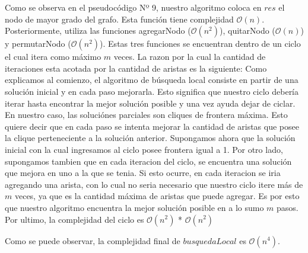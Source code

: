 \begin{itemize}
Como se observa en el pseudocódigo Nº 9, nuestro algoritmo coloca en $res$ el nodo de mayor grado del grafo. Esta función tiene complejidad $\mathcal{O}(n)$.
Posteriormente, utiliza las funciones agregarNodo ($\mathcal{O}(n^{2})$), quitarNodo ($\mathcal{O}(n)$) y permutarNodo ($\mathcal{O}(n^{2})$). Estas tres funciones se encuentran dentro de un ciclo el cual itera como máximo $m$ veces. La razon por la cual la cantidad de iteraciones esta acotada por la cantidad de aristas es la siguiente:\newline
Como explicamos al comienzo, el algoritmo de búsqueda local consiste en partir de una solución inicial y en cada paso mejorarla. Esto significa que nuestro ciclo debería iterar hasta encontrar la mejor solución posible y una vez ayuda dejar de ciclar. En nuestro caso, las soluciónes parciales son cliques de frontera máxima. Esto quiere decir que en cada paso se intenta mejorar la cantidad de aristas que posee la clique perteneciente a la solución anterior. Supongamos ahora que la solución inicial con la cual ingresamos al ciclo posee frontera igual a 1. Por otro lado, supongamos tambien que en cada iteracion del ciclo, se encuentra una solución que mejora en uno a la que se tenia. Si  esto ocurre, en cada iteracion se iria agregando una arista, con lo cual no seria necesario que nuestro ciclo itere más de $m$ veces, ya que es la cantidad máxima de aristas que puede agregar. Es por esto que nuestro algoritmo encuentra la mejor solución posible en a lo sumo $m$ pasos. Por ultimo, la complejidad del ciclo es $\mathcal{O}(n^{2})$ * $\mathcal{O}(n^{2})$                                                                        
                                                                                
\newline
Como se puede observar, la complejidad final de $busquedaLocal$ es $\mathcal{O}(n^{4})$.
\end{itemize}
